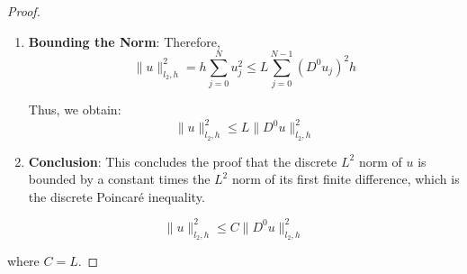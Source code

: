 \documentclass[11pt,a4paper]{article}
\theoremstyle{plain}
\theoremstyle{definition}
\theoremstyle{remark}
\begin{document}
\begin{proof}
\begin{enumerate}
    \item \textbf{Bounding the Norm}:
    Therefore,
    \[
    \|u\|_{l_2,h}^2 = h \sum_{j=0}^{N} u_j^2 \leq L \sum_{j=0}^{N-1} (D^0 u_j)^2 h
    \]

    Thus, we obtain:
    \[
    \|u\|_{l_2,h}^2 \leq L \|D^0 u\|_{l_2,h}^2
    \]

    \item \textbf{Conclusion}:
    This concludes the proof that the discrete \( L^2 \) norm of \( u \) is bounded by a constant times the \( L^2 \) norm of its first finite difference, which is the discrete Poincaré inequality.
\end{enumerate}

\[
\boxed{\|u\|_{l_2,h}^2 \leq C \|D^0 u\|_{l_2,h}^2}
\]

where \( C = L \).
    
\end{proof}
\end{document}
